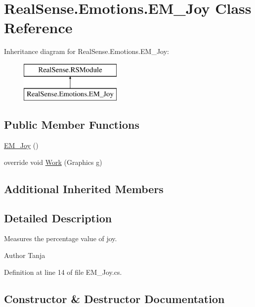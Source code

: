 \hypertarget{class_real_sense_1_1_emotions_1_1_e_m___joy}{}\section{Real\+Sense.\+Emotions.\+E\+M\+\_\+\+Joy Class Reference}
\label{class_real_sense_1_1_emotions_1_1_e_m___joy}
Inheritance diagram for Real\+Sense.\+Emotions.\+E\+M\+\_\+\+Joy\+:\begin{figure}[H]
\begin{center}
\leavevmode
\includegraphics[height=2.000000cm]{class_real_sense_1_1_emotions_1_1_e_m___joy}
\end{center}
\end{figure}
\subsection*{Public Member Functions}
\begin{DoxyCompactItemize}
\item 
\hyperlink{class_real_sense_1_1_emotions_1_1_e_m___joy_a1e37185e1aadd7a6e9c38414b5eb22fe}{E\+M\+\_\+\+Joy} ()
\item 
override void \hyperlink{class_real_sense_1_1_emotions_1_1_e_m___joy_acce5a4daa0acfd1a10d0aac92ef278c8}{Work} (Graphics g)
\end{DoxyCompactItemize}
\subsection*{Additional Inherited Members}


\subsection{Detailed Description}
Measures the percentage value of joy. \begin{DoxyAuthor}{Author}
Tanja 
\end{DoxyAuthor}


Definition at line 14 of file E\+M\+\_\+\+Joy.\+cs.



\subsection{Constructor \& Destructor Documentation}
\mbox{\label{class_real_sense_1_1_emotions_1_1_e_m___joy_a1e37185e1aadd7a6e9c38414b5eb22fe}} 

